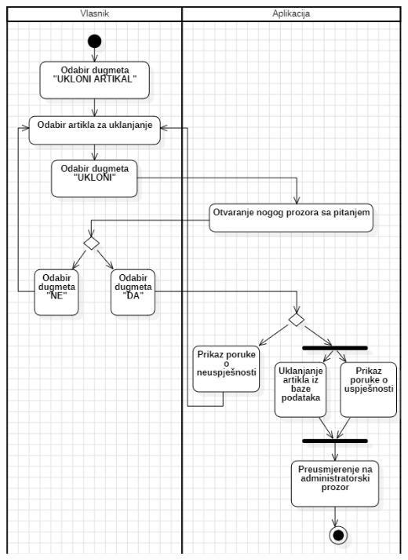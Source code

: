 \documentclass{scrreprt}
\begin{document}
\begin{center}
	\includegraphics[width=14cm]{./img/09.png}
\end{center}

\pagebreak
\end{document}
